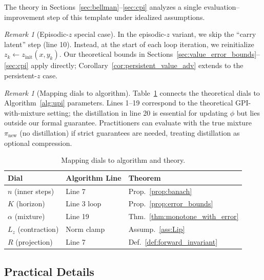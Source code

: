 \documentclass{article}
\theoremstyle{plain}
\theoremstyle{definition}
\theoremstyle{remark}
\newtheorem{remark}[theorem]{Remark}
\newcommand{\longonly}[1]{}
\newcommand{\longonly}[1]{#1}
\begin{document}
{The theory in Sections~\ref{sec:bellman}--\ref{sec:cpi} analyzes a single evaluation--improvement step of this template under idealized assumptions.

\begin{remark}[Episodic-$z$ special case]
\label{rem:episodic_z_algo}
In the episodic-$z$ variant, we skip the ``carry latent'' step (line 10). Instead, at the start of each loop iteration, we reinitialize $z_k \gets z_{\mathrm{init}}(x,y_k)$.
Our theoretical bounds in Sections~\ref{sec:value_error_bounds}--\ref{sec:cpi} apply directly; Corollary~\ref{cor:persistent_value_adv} extends to the persistent-$z$ case.
\end{remark}

\begin{remark}[Mapping dials to algorithm]
Table~\ref{tab:dial_mapping} connects the theoretical dials to Algorithm~\ref{alg:upi} parameters.
Lines 1--19 correspond to the theoretical GPI-with-mixture setting; the distillation in line 20 is essential for updating $\phi$ but lies outside our formal guarantee.
Practitioners can evaluate with the true mixture $\pi_{\mathrm{new}}$ (no distillation) if strict guarantees are needed, treating distillation as optional compression.
\end{remark}

\begin{table}[t]
\caption{Mapping dials to algorithm and theory.}
\label{tab:dial_mapping}
\centering
\small
\begin{tabular*}{\columnwidth}{@{\extracolsep{\fill}}lll@{}}
\toprule
Dial & Algorithm Line & Theorem \\
\midrule
$n$ (inner steps) & Line 7 & Prop.~\ref{prop:banach}\longonly{, Cor.~\ref{cor:epsA_dials}} \\
$K$ (horizon) & Line 3 loop & Prop.~\ref{prop:error_bounds} \\
$\alpha$ (mixture) & Line 19 & Thm.~\ref{thm:monotone_with_error} \\
$L_z$ (contraction) & Norm clamp & Assump.~\ref{ass:Lip} \\
$R$ (projection) & Line 7 & Def.~\ref{def:forward_invariant} \\
\bottomrule
\end{tabular*}
\end{table}

\subsection{Practical Details}
\label{sec:practical}

}
\end{document}
